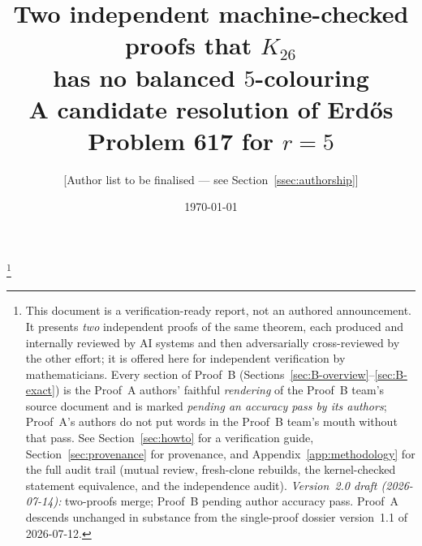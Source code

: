 \documentclass[11pt,reqno]{amsart}
\theoremstyle{definition}
\theoremstyle{remark}
\begin{document}
\title[Erd\H{o}s Problem 617 at $r=5$: two candidate proofs]{Two independent machine-checked proofs that $K_{26}$\\
has no balanced $5$-colouring\\[2pt]
{\normalsize A candidate resolution of Erd\H{o}s Problem 617 for $r=5$}}

\author{[Author list to be finalised --- see Section~\ref{ssec:authorship}]}
\date{\today}

\thanks{This document is a verification-ready report, not an authored announcement.
It presents \emph{two} independent proofs of the same theorem, each produced and
internally reviewed by AI systems and then adversarially cross-reviewed by the other
effort; it is offered here for independent verification by mathematicians. Every
section of Proof~B (Sections~\ref{sec:B-overview}--\ref{sec:B-exact}) is the Proof~A
authors' faithful \emph{rendering} of the Proof~B team's source document and is marked
\emph{pending an accuracy pass by its authors}; Proof~A's authors do not put words in
the Proof~B team's mouth without that pass. See Section~\ref{sec:howto} for a
verification guide, Section~\ref{sec:provenance} for provenance, and
Appendix~\ref{app:methodology} for the full audit trail (mutual review, fresh-clone
rebuilds, the kernel-checked statement equivalence, and the independence audit).
\emph{Version~2.0 draft (2026-07-14):} two-proofs merge; Proof~B pending author
accuracy pass. Proof~A descends unchanged in substance from the single-proof
dossier version~1.1 of 2026-07-12.}
\end{document}
